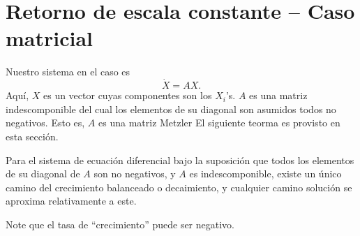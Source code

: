 \section{Retorno de escala constante -- Caso matricial}

Nuestro sistema en el caso es
\begin{equation}
\dot{X}=AX.
\end{equation}
Aquí, $X$ es un vector cuyas componentes son los $X_{i}$'s. $A$ es una matriz indescomponible del cual los elementos de su diagonal son asumidos todos no negativos. Esto es, $A$ es una matriz Metzler %
El siguiente teorma es provisto en esta sección.

\begin{theorem}
Para el sistema de ecuación diferencial%
bajo la suposición que todos los elementos de su diagonal de $A$ son no negativos, y $A$ es indescomponible, existe un único camino del crecimiento balanceado o decaimiento, y cualquier camino solución se aproxima relativamente a este.

Note que el tasa de ``crecimiento'' puede ser negativo.


\end{theorem}
